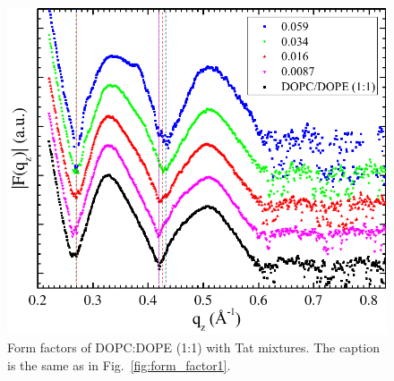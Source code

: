 \begin{figure}[htbp]
  \centering
  \includegraphics[width=\textwidth]{figures/Tat/NFIT_results/DOPCDOPE1to1_form_factors}
  \caption{Form factors of DOPC:DOPE (1:1) with Tat mixtures.
  The caption is the same as in Fig.~\ref{fig:form_factor1}.}
  \label{fig:form_factor3}
\end{figure}


